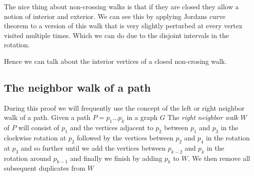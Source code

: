   The nice thing about non-crossing walks is that if they are closed they allow a notion of interior and exterior. We can see this by applying Jordans curve theorem to a version of this walk that is very slightly perturbed at every vertex visited multiple times. Which we can do due to the disjoint intervals in the rotation.

  Hence we can talk about the interior vertices of a closed non-crosing walk.




\subsection{The neighbor walk of a path}
  During this proof we will frequently use the concept of the left or right neighbor walk of a path.
  Given a path $P = p_1 \ldots p_k$ in a graph $G$
  The \emph{right neighbor walk} $W$ of $P$ will consist of $p_1$ and the vertices adjacent to $p_{2}$ between $p_1$ and $p_{3}$ in the clockwise rotation at $p_{2}$ followed by the vertices between $p_{2}$ and $p_{4}$ in the rotation at $p_{3}$ and so further until we add the vertices between $p_{k-2}$ and $p_k$ in the rotation around $p_{k-1}$ and finally we finish by adding $p_k$ to $W$.
  We then remove all subsequent duplicates from $W$

